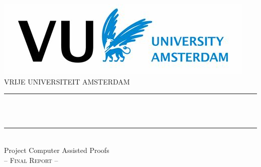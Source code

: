 
\begin{titlepage}
	\centering
    \vspace*{1 cm}
    \includegraphics[scale = 0.50]{Image/VU_logo.jpg}\\[1.0 cm]	%
    \textsc{\LARGE VRIJE UNIVERSITEIT AMSTERDAM}\\%
	\vspace{0.3cm}
	\rule{\linewidth}{0.2 mm} \\[0.3 cm]
	{ \huge \bfseries \thetitle}\\[0.2cm]
	\rule{\linewidth}{0.2 mm} \\[0.6 cm]%
	
	{\Large
Project Computer Assisted Proofs
	\\}
	\vspace{1em}
    \textsc{\Large -- Final Report --}\\[0.5 cm]	%
	\vspace{4.7cm}
	\vspace{2.7cm}
	

\end{titlepage}
